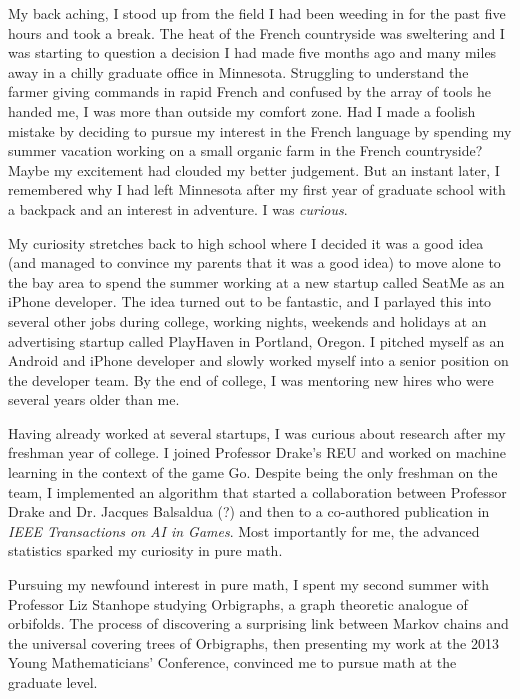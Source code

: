 \documentclass[12pt]{article}
\title{}
\begin{document}
My back aching, I stood up from the field I had been weeding in for the past five hours and took a break. The heat of the French countryside was sweltering and I was starting to question a  decision I had made five months ago and many miles away in a chilly graduate office in Minnesota. Struggling to understand the farmer giving commands in rapid French and confused by the array of tools he handed me, I was more than outside my comfort zone. Had I made a foolish mistake by deciding to pursue my interest in the French language by spending my summer vacation working on a small organic farm in the French countryside? Maybe my excitement had clouded my better judgement. But an instant later, I remembered why I had left Minnesota after my first year of graduate school with a backpack and an interest in adventure. I was \textit{curious}.  

My curiosity stretches back to high school where I decided it was a good idea (and managed to convince my parents that it was a good idea) to move alone to the bay area to spend the summer working at a new startup called SeatMe as an iPhone developer. The idea turned out to be fantastic, and I parlayed this into several other jobs during college, working nights, weekends and holidays at an advertising startup called PlayHaven in Portland, Oregon. I pitched myself as an Android and iPhone developer and slowly worked myself into a senior position on the developer team. By the end of college, I was mentoring new hires who were several years older than me.

Having already worked at several startups, I was curious about research after my freshman year of college. I joined Professor Drake's REU and worked on machine learning in the context of the game Go. Despite being the only freshman on the team, I implemented an algorithm that started a collaboration between Professor Drake and Dr. Jacques Balsaldua (?) and then to a co-authored publication in \textit{IEEE Transactions on AI in Games}. Most importantly for me, the advanced statistics sparked my curiosity in pure math. 

Pursuing my newfound interest in pure math, I spent my second summer with Professor Liz Stanhope studying Orbigraphs, a graph theoretic analogue of orbifolds. The process of discovering a surprising link between Markov chains and the universal covering trees of Orbigraphs, then presenting my work at the 2013 Young Mathematicians' Conference, convinced me to pursue math at the graduate level. 
\end{document}
